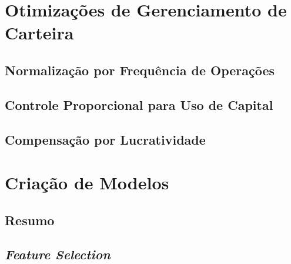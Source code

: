 \section{Otimizações de Gerenciamento de Carteira}

\subsection{Normalização por Frequência de Operações}
\paragraph{}

\subsection{Controle Proporcional para Uso de Capital}
\paragraph{}

\subsection{Compensação por Lucratividade}
\paragraph{}



\section{Criação de Modelos}

\subsection{Resumo}
\paragraph{}

\subsection{\textit{Feature Selection}}
\paragraph{}

